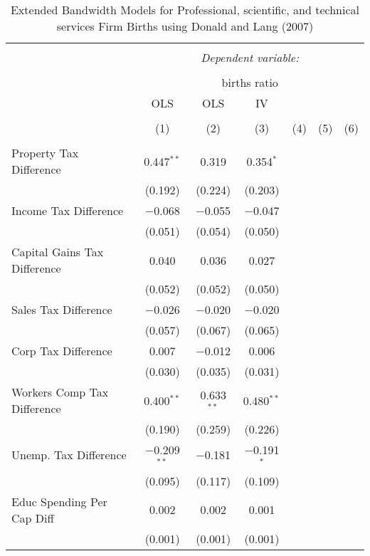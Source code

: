 
\begin{table}[!htbp] \centering 
  \caption{Extended Bandwidth Models for  Professional, scientific, and technical services Firm Births using Donald and Lang (2007)} 
  \label{} 
\begin{tabular}{@{\extracolsep{5pt}}lcccccc} 
\\[-1.8ex]\hline 
\hline \\[-1.8ex] 
 & \multicolumn{6}{c}{\textit{Dependent variable:}} \\ 
\cline{2-7} 
\\[-1.8ex] & \multicolumn{6}{c}{births ratio} \\ 
 & OLS & OLS & IV &  &  &  \\ 
\\[-1.8ex] & (1) & (2) & (3) & (4) & (5) & (6)\\ 
\hline \\[-1.8ex] 
 Property Tax Difference & 0.447$^{**}$ & 0.319 & 0.354$^{*}$ &  &  &  \\ 
  & (0.192) & (0.224) & (0.203) &  &  &  \\ 
  Income Tax Difference & $-$0.068 & $-$0.055 & $-$0.047 &  &  &  \\ 
  & (0.051) & (0.054) & (0.050) &  &  &  \\ 
  Capital Gains Tax Difference & 0.040 & 0.036 & 0.027 &  &  &  \\ 
  & (0.052) & (0.052) & (0.050) &  &  &  \\ 
  Sales Tax Difference & $-$0.026 & $-$0.020 & $-$0.020 &  &  &  \\ 
  & (0.057) & (0.067) & (0.065) &  &  &  \\ 
  Corp Tax Difference & 0.007 & $-$0.012 & 0.006 &  &  &  \\ 
  & (0.030) & (0.035) & (0.031) &  &  &  \\ 
  Workers Comp Tax Difference & 0.400$^{**}$ & 0.633$^{**}$ & 0.480$^{**}$ &  &  &  \\ 
  & (0.190) & (0.259) & (0.226) &  &  &  \\ 
  Unemp. Tax Difference & $-$0.209$^{**}$ & $-$0.181 & $-$0.191$^{*}$ &  &  &  \\ 
  & (0.095) & (0.117) & (0.109) &  &  &  \\ 
  Educ Spending Per Cap Diff & 0.002 & 0.002 & 0.001 &  &  &  \\ 
  & (0.001) & (0.001) & (0.001) &  &  &  \\ 

\end{tabular}
\end{table}
